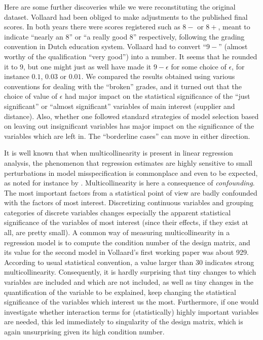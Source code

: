 \documentclass[alpha-refs]{wiley-article}
\begin{document}
Here are some further discoveries while we were reconstituting the original dataset.  Vollaard had been obliged to make adjustments to the published final scores.  In both years there were scores registered such as $8-$ or $8+$, meant to indicate ``nearly an 8'' or ``a really good 8'' respectively, following the grading convention in Dutch education system. 
Vollaard had to convert ``$9-$'' (almost worthy of the qualification ``very good'') into a number.  It seems that he rounded it to $9$, but one might just as well have made it $9-\epsilon$ for some choice of $\epsilon$, for instance $0.1$, $0.03$ or $0.01$. We compared the results obtained using various conventions for dealing with the ``broken'' grades, and it turned out that the choice of value of $\epsilon$ had major impact on the statistical significance of the ``just significant'' or ``almost significant'' variables of main interest (supplier and distance). Also, whether one followed standard strategies of model selection based on leaving out insignificant variables has major impact on the significance of the variables which are left in. The ``borderline cases'' can move in either direction.

It is well known that when multicollinearity is present in linear regression analysis, the phenomenon that regression estimates are highly sensitive to small perturbations in model misspecification is commonplace and even to be expected, as noted for instance by \citet{winship2016multicollinearity}. Multicollinearity is here a consequence of \emph{confounding}. The most important factors from a statistical point of view are badly confounded with the factors of most interest. Discretizing continuous variables and grouping categories of discrete variables changes especially the apparent statistical significance of the variables of most interest (since their effects, if they exist at all, are pretty small).
A common way of measuring multicollinearity in a regression model is to compute the condition number of the design matrix, and its value for the second model in Vollaard's first working paper was about 929.  According to usual statistical convention, a value larger than 30 indicates strong multicollinearity.  Consequently, it is hardly surprising that tiny changes to which variables are included and which are not included, as well as tiny changes in the quantification of the variable to be explained, keep changing the statistical significance of the variables which interest us the most.
Furthermore, if one would investigate whether interaction terms for (statistically) highly important variables are needed, this led immediately to singularity of the design matrix, which is again unsurprising given its high condition number. 
\end{document}
